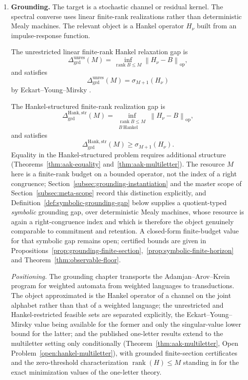 \documentclass[12pt]{article}
\theoremstyle{definition}
\DeclareMathOperator{\rank}{rank}
\newcommand{\norm}[1]{\left\lVert#1\right\rVert}
\newcommand{\Dunres}{\Delta_{\mathrm{grd}}^{\mathrm{unres}}}
\newcommand{\DHankstr}{\Delta_{\mathrm{grd}}^{\mathrm{Hank,str}}}
\begin{document}
\begin{enumerate}[label=(\arabic*),leftmargin=2.2em]
\item \textbf{Grounding.}
The target is a stochastic channel or residual kernel.  The spectral converse
uses linear finite-rank realizations rather than deterministic Mealy
machines.  The relevant object is a Hankel operator $H_\nu$ built from an
impulse-response function.

The unrestricted linear finite-rank Hankel relaxation gap is
\[
\Dunres(M)
=
\inf_{\operatorname{rank}B\le M}
\norm{H_\nu-B}_{\mathrm{op}},
\]
and satisfies
\[
\Dunres(M)
=
\sigma_{M+1}(H_\nu)
\]
by Eckart--Young--Mirsky \cite{eckart1936,mirsky1960}.

The Hankel-structured finite-rank realization gap is
\[
\DHankstr(M)
=
\inf_{\substack{
\operatorname{rank}B\le M\\
B\ \text{Hankel}
}}
\norm{H_\nu-B}_{\mathrm{op}},
\]
and satisfies
\[
\DHankstr(M)
\ge
\sigma_{M+1}(H_\nu).
\]
Equality in the Hankel-structured problem requires additional structure
(Theorems~\ref{thm:aak-equality} and~\ref{thm:aak-multiletter}).  The
resource $M$ here is a finite-rank budget on a bounded operator, not the
index of a right congruence; Section~\ref{subsec:grounding-instantiation} and
the master scope of Section~\ref{subsec:meta-scope} record this distinction
explicitly, and Definition~\ref{def:symbolic-grounding-gap} below supplies a
quotient-typed \emph{symbolic} grounding gap, over deterministic Mealy
machines, whose resource is again a right-congruence index and which is
therefore the object genuinely comparable to commitment and retention.  A
closed-form finite-budget value for that symbolic gap remains open; certified
bounds are given in
Propositions~\ref{prop:grounding-finite-section},~\ref{prop:symbolic-finite-horizon}
and Theorem~\ref{thm:observable-floor}.

\emph{Positioning.}  The grounding chapter transports the
Adamjan--Arov--Krein program for weighted automata
\cite{balle2021,lacroce2024} from weighted languages to transductions.  The
object approximated is the Hankel operator of a channel on the joint alphabet
rather than that of a weighted language; the unrestricted and
Hankel-restricted feasible sets are separated explicitly, the
Eckart--Young--Mirsky value being available for the former and only the
singular-value lower bound for the latter; and the published one-letter
results extend to the multiletter setting only conditionally
(Theorem~\ref{thm:aak-multiletter}, Open Problem~\ref{open:hankel-multiletter}),
with grounded finite-section certificates and the zero-threshold
characterization $\rank(H)\le M$ standing in for the exact minimization values
of the one-letter theory.
\end{enumerate}
\end{document}
